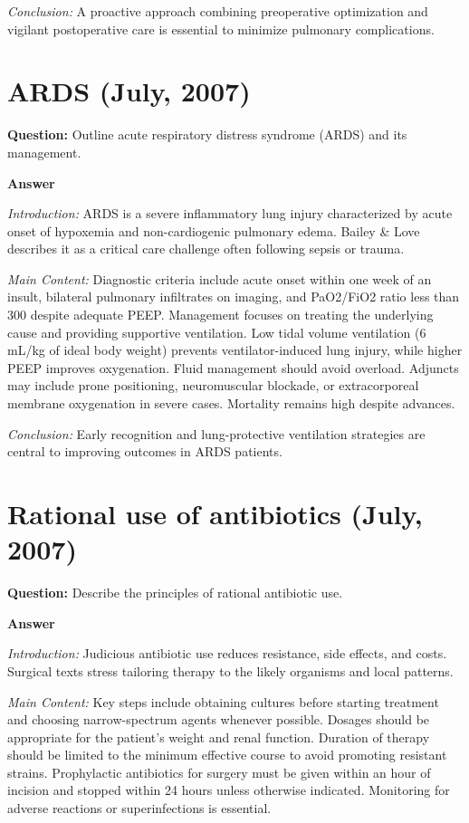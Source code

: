 \documentclass{article}
\begin{document}
\emph{Conclusion:} A proactive approach combining preoperative optimization and vigilant postoperative care is essential to minimize pulmonary complications.


\section{ARDS (July, 2007)}


\textbf{Question:} Outline acute respiratory distress syndrome (ARDS) and its management.

\textbf{Answer}

\emph{Introduction:} ARDS is a severe inflammatory lung injury characterized by acute onset of hypoxemia and non-cardiogenic pulmonary edema. Bailey \& Love describes it as a critical care challenge often following sepsis or trauma.

\emph{Main Content:} Diagnostic criteria include acute onset within one week of an insult, bilateral pulmonary infiltrates on imaging, and PaO2/FiO2 ratio less than 300 despite adequate PEEP. Management focuses on treating the underlying cause and providing supportive ventilation. Low tidal volume ventilation (6 mL/kg of ideal body weight) prevents ventilator-induced lung injury, while higher PEEP improves oxygenation. Fluid management should avoid overload. Adjuncts may include prone positioning, neuromuscular blockade, or extracorporeal membrane oxygenation in severe cases. Mortality remains high despite advances.

\emph{Conclusion:} Early recognition and lung-protective ventilation strategies are central to improving outcomes in ARDS patients.


\section{Rational use of antibiotics (July, 2007)}


\textbf{Question:} Describe the principles of rational antibiotic use.

\textbf{Answer}

\emph{Introduction:} Judicious antibiotic use reduces resistance, side effects, and costs. Surgical texts stress tailoring therapy to the likely organisms and local patterns.

\emph{Main Content:} Key steps include obtaining cultures before starting treatment and choosing narrow-spectrum agents whenever possible. Dosages should be appropriate for the patient's weight and renal function. Duration of therapy should be limited to the minimum effective course to avoid promoting resistant strains. Prophylactic antibiotics for surgery must be given within an hour of incision and stopped within 24 hours unless otherwise indicated. Monitoring for adverse reactions or superinfections is essential.
\end{document}
